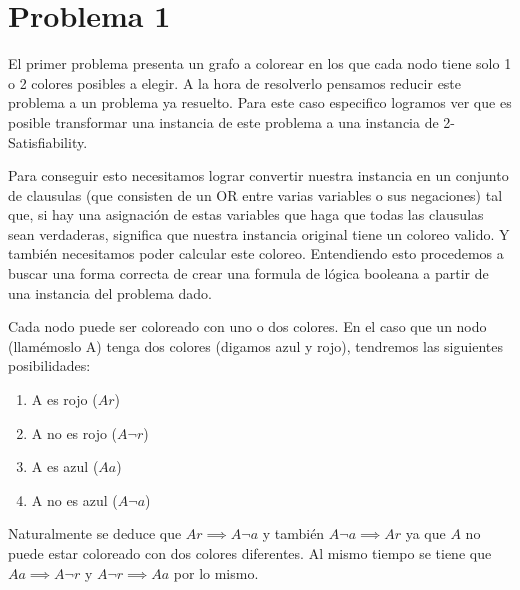 \documentclass{article}
\theoremstyle{definition}
\theoremstyle{remark}
\begin{document}
{} %

\subtitulo{}
\grupo{}

 
\maketitle

\pagebreak

\tableofcontents

\pagebreak

\section{Problema 1}

El primer problema presenta un grafo a colorear en los que cada nodo tiene solo 1 o 2 colores posibles a elegir. A la hora de resolverlo pensamos reducir este problema a un problema ya resuelto. Para este caso especifico logramos ver que es posible transformar una instancia de este problema a una instancia de 2-Satisfiability.\par
Para conseguir esto necesitamos lograr convertir nuestra instancia en un conjunto de clausulas (que consisten de un OR entre varias variables o sus negaciones) tal que, si hay una asignación de estas variables que haga que todas las clausulas sean verdaderas, significa que nuestra instancia original tiene un coloreo valido. Y también necesitamos poder calcular este coloreo.\smallbreak
Entendiendo esto procedemos a buscar una forma correcta de crear una formula de lógica booleana a partir de una instancia del problema dado.\par
Cada nodo puede ser coloreado con uno o dos colores. 
En el caso que un nodo (llamémoslo A) tenga dos colores (digamos azul y rojo), tendremos las siguientes posibilidades:
\begin{enumerate}
\item A es rojo ($Ar$)
\item A no es rojo ($A\neg r$)
\item A es azul ($Aa$)
\item A no es azul ($A\neg a$)
\end{enumerate}
Naturalmente se deduce que $Ar \implies A\neg a$ y también $A\neg a \implies Ar$ ya que $A$ no puede estar coloreado con dos colores diferentes. Al mismo tiempo se tiene que $Aa \implies A\neg r$ y $A\neg r \implies Aa$ por lo mismo.
\end{document}
